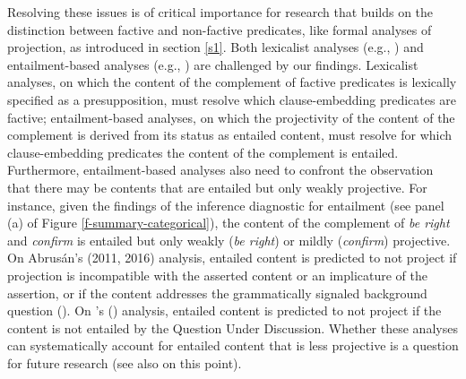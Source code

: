 \documentclass[11pt,fleqn]{article}
\newcommand{\6}{\mbox{$[\hspace*{-.6mm}[$}}
\newcommand{\9}{\mbox{$]\hspace*{-.6mm}]$}}
\newcommand{\citetpos}[1]{\citeauthor{#1}'s (\citeyear{#1})}
\begin{document}
{Resolving these issues is of critical importance for research that builds on the distinction between factive and non-factive predicates, like formal analyses of projection, as introduced in section \ref{s1}. Both lexicalist analyses (e.g., \citealt{heim83,vds92}) and entailment-based analyses (e.g., \citealt{abrusan2011,abrusan2016,romoli2015,best-question}) are challenged by our findings. Lexicalist analyses, on which the content of the complement of factive predicates is lexically specified as a presupposition, must resolve which clause-embedding predicates are factive; entailment-based analyses, on which the projectivity of the content of the complement is derived from its status as entailed content, must resolve for which clause-embedding predicates the content of the complement is entailed. Furthermore, entailment-based analyses also need to confront the observation that there may be contents that are entailed but only weakly projective. For instance, given the findings of the inference diagnostic for entailment (see panel (a) of Figure \ref{f-summary-categorical}), the content of the complement of {\em be right} and {\em confirm} is entailed but only weakly  ({\em be right}) or mildly ({\em confirm}) projective. On Abrus\'an's (2011, 2016) analysis, entailed content is predicted to not project if projection is incompatible with the asserted content or an implicature of the assertion, or if the content addresses the grammatically signaled background question (\citealt[511, 532]{abrusan2011}). On  \citetpos{best-question} analysis, entailed content is predicted to not project if the content is not entailed by the Question Under Discussion. Whether these analyses can systematically account for entailed content that is less projective is a question for future research (see also \citealt{tbd-variability} on this point).

}
\end{document}
